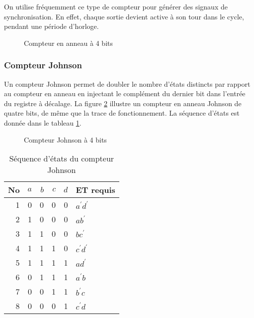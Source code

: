 \documentclass[11pt]{article}
\begin{document}
On utilise fréquemment ce type de compteur pour générer des signaux de
synchronisation. En effet, chaque sortie devient active à son tour
dans le cycle, pendant une période d'horloge.

\begin{figure}[htbp]
\centering

\caption{\label{fig:org612ce8c}Compteur en anneau à 4 bits}
\end{figure}

\subsubsection{Compteur Johnson}
\label{sec:org17a766e}

Un compteur Johnson permet de doubler le nombre d'états distincts par
rapport au compteur en anneau en injectant le complément du dernier
bit dans l'entrée du registre à décalage.  La figure \ref{fig:org1570776}
illustre un compteur en anneau Johnson de quatre bits, de même que la
trace de fonctionnement. La séquence d'états est donnée dans le
tableau \ref{tab:org9434beb}.


\begin{figure}[htbp]
\centering

\caption{\label{fig:org1570776}Compteur Johnson à 4 bits}
\end{figure}


\begin{table}[htbp]
\caption{\label{tab:org9434beb}Séquence d'états du compteur Johnson}
\centering
\begin{tabular}{rrrrrl}
No & \(a\) & \(b\) & \(c\) & \(d\) & ET requis\\[0pt]
\hline
1 & 0 & 0 & 0 & 0 & \(a^\prime d^\prime\)\\[0pt]
2 & 1 & 0 & 0 & 0 & \(a b^\prime\)\\[0pt]
3 & 1 & 1 & 0 & 0 & \(b c^\prime\)\\[0pt]
4 & 1 & 1 & 1 & 0 & \(c^\prime d^\prime\)\\[0pt]
5 & 1 & 1 & 1 & 1 & \(a d^\prime\)\\[0pt]
6 & 0 & 1 & 1 & 1 & \(a^\prime b\)\\[0pt]
7 & 0 & 0 & 1 & 1 & \(b^\prime c\)\\[0pt]
8 & 0 & 0 & 0 & 1 & \(c^\prime d\)\\[0pt]
\end{tabular}
\end{table}
\end{document}
